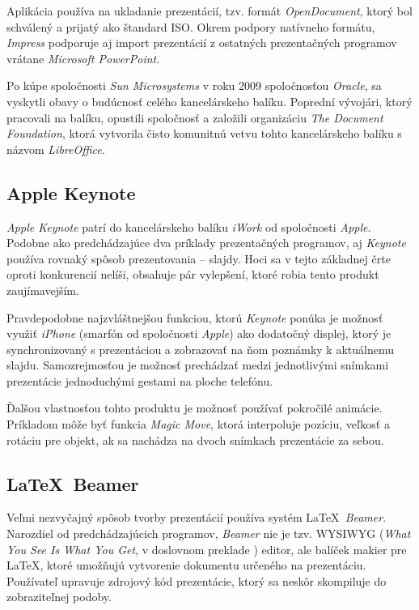 Aplikácia používa na ukladanie prezentácií, tzv. formát \textit{OpenDocument}, ktorý bol schválený a prijatý ako štandard ISO. Okrem podpory natívneho formátu, \textit{Impress} podporuje aj import prezentácií z ostatných prezentačných programov vrátane \textit{Microsoft PowerPoint}.

Po kúpe spoločnosti \textit{Sun Microsystems} v roku 2009 spoločnosťou \textit{Oracle}, sa vyskytli obavy o budúcnosť celého kancelárskeho balíku. Poprední vývojári, ktorý pracovali na balíku, opustili spoločnosť a založili organizáciu \textit{The Document Foundation}, ktorá vytvorila čisto komunitnú vetvu tohto kancelárskeho balíku s názvom \textit{LibreOffice}.

\subsection{Apple Keynote}

\textit{Apple Keynote} patrí do kancelárskeho balíku \textit{iWork} od spoločnosti \textit{Apple}. Podobne ako predchádzajúce dva príklady prezentačných programov, aj \textit{Keynote} používa rovnaký spôsob prezentovania -- slajdy. Hoci sa v tejto základnej črte oproti konkurencií nelíši, obsahuje pár vylepšení, ktoré robia tento produkt zaujímavejším.

Pravdepodobne najzvláštnejšou funkciou, ktorú \textit{Keynote} ponúka je možnosť využiť \textit{iPhone} (smarfón od spoločnosti \textit{Apple}) ako dodatočný displej, ktorý je synchronizovaný s prezentáciou a zobrazovať na ňom poznámky k aktuálnemu slajdu. Samozrejmosťou je možnosť prechádzať medzi jednotlivými snímkami prezentácie jednoduchými gestami na ploche telefónu.

Ďalšou vlastnosťou tohto produktu je možnosť používať pokročilé animácie. Príkladom môže byť funkcia \textit{Magic Move}, ktorá interpoluje pozíciu, veľkosť a rotáciu pre objekt, ak sa nachádza na dvoch snímkach prezentácie za sebou.

\subsection{\LaTeX\ Beamer}

Veľmi nezvyčajný spôsob tvorby prezentácií používa systém \LaTeX\ \textit{Beamer}. Narozdiel od predchádzajúcich programov, \textit{Beamer} nie je tzv. WYSIWYG (\textit{What You See Is What You Get}, v doslovnom preklade ) editor, ale balíček makier pre \LaTeX, ktoré umožňujú vytvorenie dokumentu určeného na prezentáciu. Používateľ upravuje zdrojový kód prezentácie, ktorý sa neskôr skompiluje do zobraziteľnej podoby.

